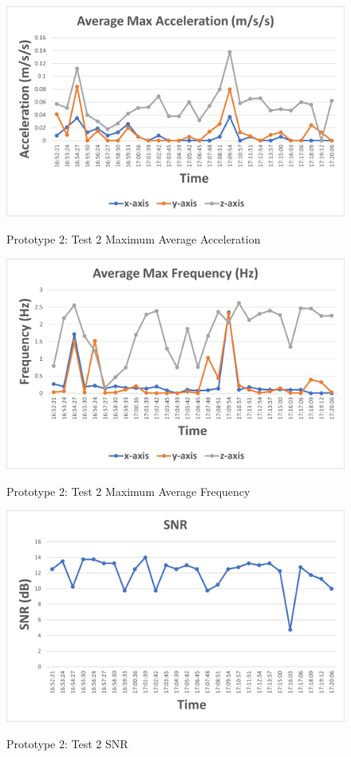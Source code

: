\begin{figure}[H]
	\centering
	\caption{Prototype 2: Test 2 Maximum Average Acceleration}
	\includegraphics[width=\textwidth]{Sections/Prototype-Testing/proto2-test2-a.png}
	\label{proto2-test2-a}
\end{figure}

\begin{figure}[H]
	\centering
	\caption{Prototype 2: Test 2 Maximum Average Frequency}
	\includegraphics[width=\textwidth]{Sections/Prototype-Testing/proto2-test2-f.png}
	\label{proto2-test2-f}
\end{figure}

\begin{figure}[H]
	\centering
	\caption{Prototype 2: Test 2 SNR}
	\includegraphics[width=\textwidth]{Sections/Prototype-Testing/proto2-test2-snr.png}
	\label{proto2-test2-snr}
\end{figure}

